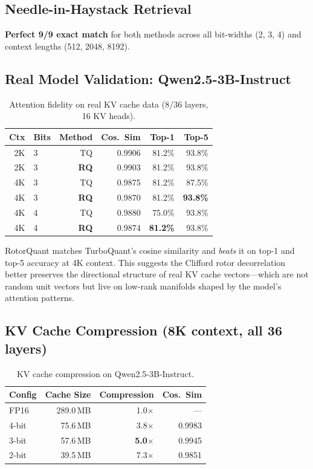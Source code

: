 \documentclass[10pt,twocolumn]{article}
\begin{document}
\subsection{Needle-in-Haystack Retrieval}

\textbf{Perfect 9/9 exact match} for both methods across all bit-widths (2, 3, 4) and context lengths (512, 2048, 8192).

\subsection{Real Model Validation: Qwen2.5-3B-Instruct}
\label{sec:real_model}

\begin{table}[h]
\centering
\caption{Attention fidelity on real KV cache data (8/36 layers, 16 KV heads).}
\label{tab:real_model}
\begin{tabular}{@{}rlrrrr@{}}
\toprule
Ctx & Bits & Method & Cos.\ Sim & Top-1 & Top-5 \\
\midrule
2K & 3 & TQ & 0.9906 & 81.2\% & 93.8\% \\
2K & 3 & \textbf{RQ} & 0.9903 & 81.2\% & 93.8\% \\
\midrule
4K & 3 & TQ & 0.9875 & 81.2\% & 87.5\% \\
4K & 3 & \textbf{RQ} & 0.9870 & 81.2\% & \textbf{93.8\%} \\
\midrule
4K & 4 & TQ & 0.9880 & 75.0\% & 93.8\% \\
4K & 4 & \textbf{RQ} & 0.9874 & \textbf{81.2\%} & 93.8\% \\
\bottomrule
\end{tabular}
\end{table}

RotorQuant matches TurboQuant's cosine similarity and \emph{beats} it on top-1 and top-5 accuracy at 4K context.
This suggests the Clifford rotor decorrelation better preserves the directional structure of real KV cache vectors---which are not random unit vectors but live on low-rank manifolds shaped by the model's attention patterns.

\subsection{KV Cache Compression (8K context, all 36 layers)}

\begin{table}[h]
\centering
\caption{KV cache compression on Qwen2.5-3B-Instruct.}
\label{tab:compression}
\begin{tabular}{@{}lrrr@{}}
\toprule
Config & Cache Size & Compression & Cos.\ Sim \\
\midrule
FP16 & 289.0\,MB & 1.0$\times$ & --- \\
4-bit & 75.6\,MB & 3.8$\times$ & 0.9983 \\
3-bit & 57.6\,MB & \textbf{5.0$\times$} & 0.9945 \\
2-bit & 39.5\,MB & 7.3$\times$ & 0.9851 \\
\bottomrule
\end{tabular}
\end{table}
\end{document}
